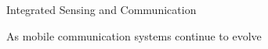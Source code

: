 
\begin{abstract}{通信感知一体化}

随着移动通信系统的持续演进

\end{abstract}

\begin{englishabstract}{Integrated Sensing and Communication}

As mobile communication systems continue to evolve

\end{englishabstract}
